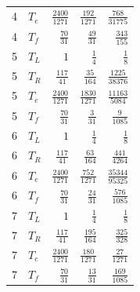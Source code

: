 \begin{longtable}{rlrrr}
4 & $T_e$ & $\frac{2400}{1271}$ & $\frac{192}{1271}$ & $\frac{768}{31775}$\\
4 & $T_f$ & $\frac{70}{31}$ & $\frac{49}{31}$ & $\frac{343}{155}$\\
5 & $T_L$ & $1$ & $\frac{1}{4}$ & $\frac{1}{8}$\\
5 & $T_R$ & $\frac{117}{41}$ & $\frac{35}{164}$ & $\frac{1225}{38376}$\\
5 & $T_e$ & $\frac{2400}{1271}$ & $\frac{1830}{1271}$ & $\frac{11163}{5084}$\\
5 & $T_f$ & $\frac{70}{31}$ & $\frac{3}{31}$ & $\frac{9}{1085}$\\
6 & $T_L$ & $1$ & $\frac{1}{4}$ & $\frac{1}{8}$\\
6 & $T_R$ & $\frac{117}{41}$ & $\frac{63}{164}$ & $\frac{441}{4264}$\\
6 & $T_e$ & $\frac{2400}{1271}$ & $\frac{752}{1271}$ & $\frac{35344}{95325}$\\
6 & $T_f$ & $\frac{70}{31}$ & $\frac{24}{31}$ & $\frac{576}{1085}$\\
7 & $T_L$ & $1$ & $\frac{1}{4}$ & $\frac{1}{8}$\\
7 & $T_R$ & $\frac{117}{41}$ & $\frac{195}{164}$ & $\frac{325}{328}$\\
7 & $T_e$ & $\frac{2400}{1271}$ & $\frac{180}{1271}$ & $\frac{27}{1271}$\\
7 & $T_f$ & $\frac{70}{31}$ & $\frac{13}{31}$ & $\frac{169}{1085}$\\
\end{longtable}
\endgroup
